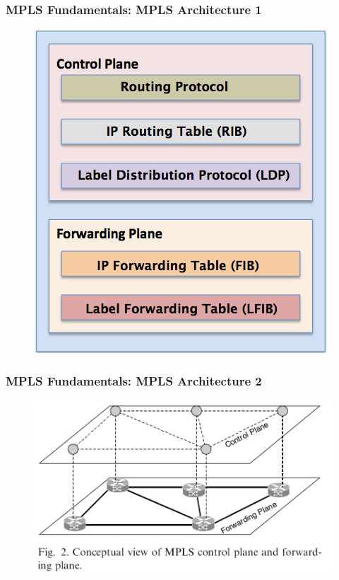\documentclass[12pt]{beamer}
\begin{document}
\begin{frame}
	\frametitle{MPLS Fundamentals: MPLS Architecture 1}
		\begin{figure}[h]
			\begin{center}
				\includegraphics[scale=0.40]{mpls-arch.png}
			\end{center}
		\end{figure}	
\end{frame}

\begin{frame}
	\frametitle{MPLS Fundamentals: MPLS Architecture 2}
		\begin{figure}[h]
			\begin{center}
				\includegraphics[scale=0.40]{separation.png}
			\end{center}
		\end{figure}
\end{frame}
\end{document}

